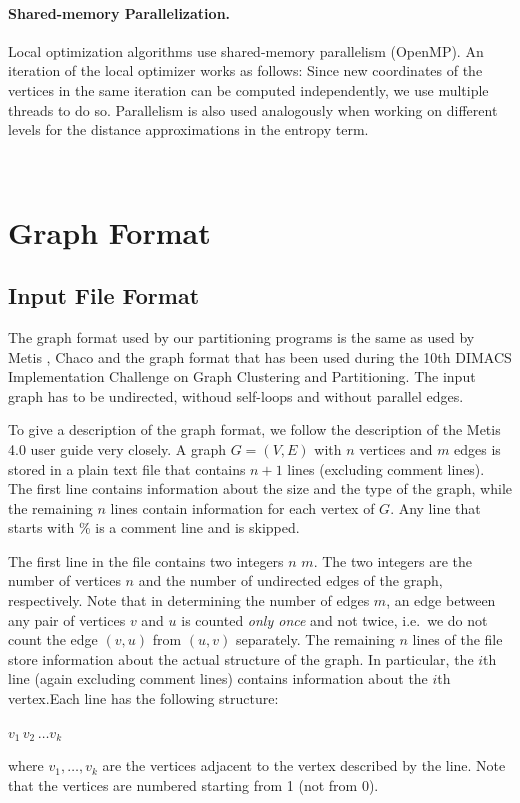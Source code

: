 \documentclass[11pt]{article}
\newcommand{\ie}{i.e.\ }
\begin{document}
\paragraph{Shared-memory Parallelization.}
%
Local optimization algorithms use shared-memory parallelism (OpenMP).
An iteration of the local optimizer works as follows: Since new coordinates of the vertices in the same iteration can be computed independently, we use multiple threads to do so. 
Parallelism is also used analogously when working on different levels for the distance approximations
in the entropy term.



\vfill
\pagebreak
\,
\pagebreak
\section{Graph Format}
\label{ss:graphformat}
\subsection{Input File Format}
The graph format used by our partitioning programs is the same as used by Metis \cite{karypis1998fast}, Chaco \cite{chaco} and the graph format that has been used during the 10th DIMACS Implementation Challenge on Graph Clustering and Partitioning. 
The input graph has to be undirected, withoud self-loops and without parallel edges.

To give a description of the graph format, we follow the description of the Metis 4.0 user guide very closely. A graph $G=(V,E)$ with $n$ vertices and $m$ edges is stored in a plain text file that contains $n+1$ lines (excluding comment lines). The first line contains information about the size and the type of the graph, while the remaining $n$ lines contain information for each vertex of $G$. Any line that starts with \% is a comment line and is skipped.

The first line in the file contains two integers $n$ $m$. The two integers are the number of vertices $n$ and the number of undirected edges of the graph, respectively. Note that in determining the number of edges $m$, an edge between any pair of vertices $v$ and $u$ is counted \emph{only once} and not twice, \ie we do not count the edge $(v,u)$ from $(u,v)$ separately. 
The remaining $n$ lines of the file store information about the actual structure of the graph. In particular, the $i$th line (again excluding comment lines) contains information about the $i$th vertex.Each line has the following structure:
\begin{center}
       $v_1\, v_2\,  \ldots v_k$ 
\end{center}
where $v_1, \ldots, v_k$ are the vertices adjacent to the vertex described by the line. Note that the vertices are numbered starting from 1 (not from 0). 
\end{document}
